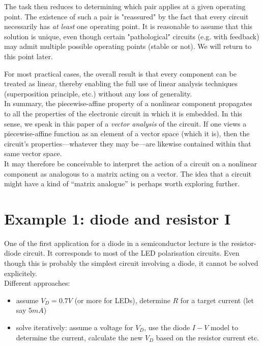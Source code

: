\documentclass[10pt]{article}
\begin{document}
The task then reduces to determining which pair applies at a given operating point.
The existence of such a pair is "reassured" by the fact that every circuit necessarily has \textit{at least} one operating point. 
It is reasonable to assume that this solution is unique, even though certain "pathological" circuits (e.g. with feedback) may admit multiple possible operating points (stable or not). We will return to this point later.

For most practical cases, the overall result is that every component can be treated as linear, thereby enabling the full use of linear analysis techniques (superposition principle, etc.) without any loss of generality.\\

In summary, the piecewise-affine property of a nonlinear component propagates to all the properties of the electronic circuit in which it is embedded. 
In this sense, we speak in this paper of a \textit{vector analysis} of the circuit. If one views a piecewise-affine function as an element of a vector space (which it is), then the circuit's properties—whatever they may be—are likewise contained within that same vector space.\\

It may therefore be conceivable to interpret the action of a circuit on a nonlinear component as analogous to a matrix acting on a vector. The idea that a circuit might have a kind of “matrix analogue” is perhaps worth exploring further.



\section*{Example 1: diode and resistor I}
One of the first application for a diode in a semiconductor lecture is the resistor-diode circuit. It corresponds to most of the LED polarisation circuits.
Even though this is probably the simplest circuit involving a diode, it cannot be solved explicitely.\\
Different approaches:
\begin{itemize}
	\item assume $V_D = 0.7V$ (or more for LEDs), determine $R$ for a target current (let say $5mA$)
	\item solve iteratively: assume a voltage for $V_D$, use the diode $I-V$ model to determine the current, calculate the new $V_D$ based on the resistor current etc.
\end{itemize}
\end{document}
